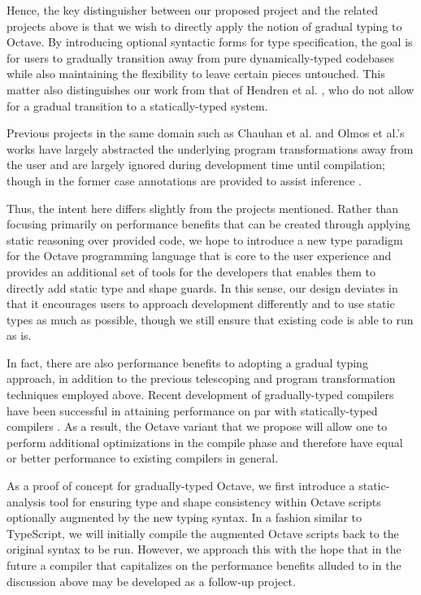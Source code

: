 Hence, the key distinguisher between our proposed project and the related projects above is that we wish to directly apply the notion of gradual typing to Octave. By introducing optional syntactic forms for type specification, the goal is for users to gradually transition away from pure dynamically-typed codebases while also maintaining the flexibility to leave certain pieces untouched. This matter also distinguishes our work from that of Hendren et al. \cite{hendren2011typing}, who do not allow for a gradual transition to a statically-typed system.

Previous projects in the same domain such as Chauhan et al. \cite{chauhan2003type} and Olmos et al.’s \cite{olmos2003turning} works have largely abstracted the underlying program transformations away from the user and are largely ignored during development time until compilation; though in the former case annotations are provided to assist inference \cite{chauhan2003type}.

Thus, the intent here differs slightly from the projects mentioned. Rather than focusing primarily on performance benefits that can be created through applying static reasoning over provided code, we hope to introduce a new type paradigm for the Octave programming language that is core to the user experience and provides an additional set of tools for the developers that enables them to directly add static type and shape guards. In this sense, our design deviates in that it encourages users to approach development differently and to use static types as much as possible, though we still ensure that existing code is able to run as is.

In fact, there are also performance benefits to adopting a gradual typing approach, in addition to the previous telescoping and program transformation techniques employed above. Recent development of gradually-typed compilers have been successful in attaining performance on par with statically-typed compilers \cite{kuhlenschmidt2018efficient}. As a result, the Octave variant that we propose will allow one to perform additional optimizations in the compile phase and therefore have equal or better performance to existing compilers in general.

As a proof of concept for gradually-typed Octave, we first introduce a static-analysis tool for ensuring type and shape consistency within Octave scripts optionally augmented by the new typing syntax. In a fashion similar to TypeScript, we will initially compile the augmented Octave scripts back to the original syntax to be run. However, we approach this with the hope that in the future a compiler that capitalizes on the performance benefits alluded to in the discussion above may be developed as a follow-up project.

